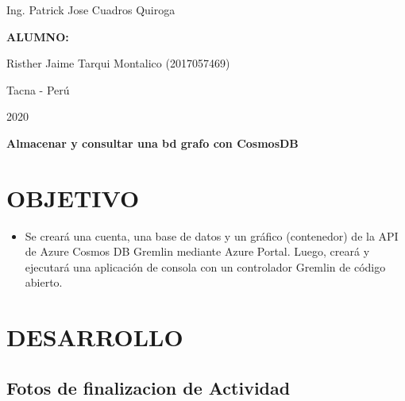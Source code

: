 \documentclass[12pt,letterpaper]{article}
\begin{document}
\begin{titlepage}
\begin{center}
\begin{Large}
			\end{Large}
			\vspace*{0.1in}
			\begin{large}
				Ing. Patrick Jose Cuadros Quiroga\\
			\end{large}
			\vspace*{0.3in}
			\begin{large}
				\textbf{ALUMNO:} \\
				\begin{flushleft}
					Risther Jaime Tarqui Montalico  		\hfill	(2017057469) \\
				\end{flushleft}
			\end{large}
			\vspace*{1.3in}
			\begin{large}
				Tacna - Perú\\
			\end{large}
			\vspace*{0.1in}
			\begin{large}
				2020\\
			\end{large}
		\end{center}
	\end{titlepage}
	
	\newpage
	
	\justify
	
	\begin{LARGE}
		\begin{center}
			\textbf{Almacenar y consultar una bd grafo con CosmosDB} \\
		\end{center}
	\end{LARGE}
	\section{OBJETIVO}
	\begin{itemize}
		\item Se creará una cuenta, una base de datos y un gráfico (contenedor) de la API de Azure Cosmos DB Gremlin mediante Azure Portal. Luego, creará y ejecutará una aplicación de consola con un controlador Gremlin de código abierto.
	\end{itemize}
	
	\section{DESARROLLO}
	\subsection{Fotos de finalizacion de Actividad}
\end{document}
